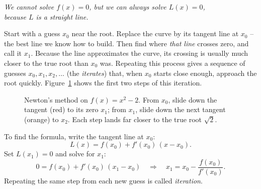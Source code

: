 \begin{center}
\emph{We cannot solve $f(x)=0$, but we can always solve $L(x)=0$,\\ because $L$
is a straight line.}
\end{center}

Start with a guess $x_0$ near the root. Replace the curve by its tangent line at
$x_0$ -- the best line we know how to build. Then find where \emph{that line}
crosses zero, and call it $x_1$. Because the line approximates the curve, its crossing
is usually much closer to the true root than $x_0$ was. Repeating this process
gives a sequence of guesses $x_0, x_1, x_2, \ldots$ (the \emph{iterates}) that,
when $x_0$ starts close enough, approach the root quickly.
Figure~\ref{ch14:fig-newton} shows the first two steps of this iteration.

\begin{figure}[H]
\centering
{}
\caption{Newton's method on $f(x)=x^2-2$. From $x_0$, slide down the tangent
(red) to its zero $x_1$; from $x_1$, slide down the next tangent (orange) to
$x_2$. Each step lands far closer to the true root $\sqrt 2$.}
\label{ch14:fig-newton}
\end{figure}

To find the formula, write the tangent line at $x_0$:
\[
L(x) = f(x_0) + f'(x_0)\,(x - x_0).
\]
Set $L(x_1)=0$ and solve for $x_1$:
\[
0 = f(x_0) + f'(x_0)\,(x_1 - x_0)
\quad\Longrightarrow\quad
x_1 = x_0 - \frac{f(x_0)}{f'(x_0)}.
\]
Repeating the same step from each new guess is called \emph{iteration}.

